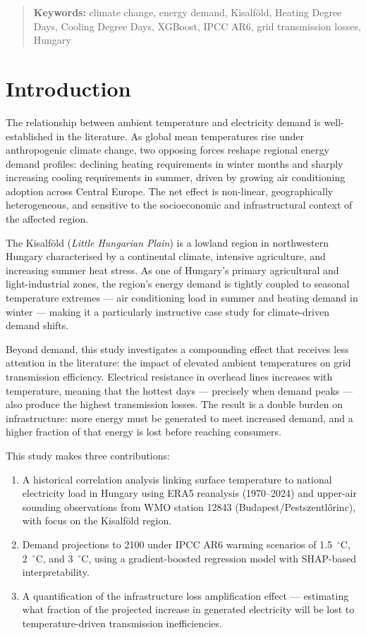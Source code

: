 \documentclass[11pt,a4paper]{article}
\begin{document}
\begin{quote}
\small\textbf{Keywords:} climate change, energy demand, Kisalf\"{o}ld,
Heating Degree Days, Cooling Degree Days, XGBoost, IPCC AR6, grid
transmission losses, Hungary
\end{quote}

\section{Introduction}
\label{sec:introduction}

The relationship between ambient temperature and electricity demand is
well-established in the literature. As global mean temperatures rise
under anthropogenic climate change, two opposing forces reshape regional
energy demand profiles: declining heating requirements in winter months
and sharply increasing cooling requirements in summer, driven by growing
air conditioning adoption across Central Europe. The net effect is
non-linear, geographically heterogeneous, and sensitive to the
socioeconomic and infrastructural context of the affected region.

The Kisalf\"{o}ld (\textit{Little Hungarian Plain}) is a lowland region
in northwestern Hungary characterised by a continental climate, intensive
agriculture, and increasing summer heat stress. As one of Hungary's
primary agricultural and light-industrial zones, the region's energy
demand is tightly coupled to seasonal temperature extremes --- air
conditioning load in summer and heating demand in winter --- making it
a particularly instructive case study for climate-driven demand shifts.

Beyond demand, this study investigates a compounding effect that receives
less attention in the literature: the impact of elevated ambient
temperatures on grid transmission efficiency. Electrical resistance in
overhead lines increases with temperature, meaning that the hottest days
--- precisely when demand peaks --- also produce the highest transmission
losses. The result is a double burden on infrastructure: more energy must
be generated to meet increased demand, and a higher fraction of that
energy is lost before reaching consumers.

This study makes three contributions:
\begin{enumerate}
  \item A historical correlation analysis linking surface temperature to
    national electricity load in Hungary using ERA5 reanalysis (1970--2024)
    and upper-air sounding observations from WMO station 12843
    (Budapest/Pestszentl\H{o}rinc), with focus on the Kisalf\"{o}ld region.
  \item Demand projections to 2100 under IPCC AR6 warming scenarios of
    1.5~$^\circ$C, 2~$^\circ$C, and 3~$^\circ$C, using a gradient-boosted
    regression model with SHAP-based interpretability.
  \item A quantification of the infrastructure loss amplification effect ---
    estimating what fraction of the projected increase in generated
    electricity will be lost to temperature-driven transmission
    inefficiencies.
\end{enumerate}
\end{document}
